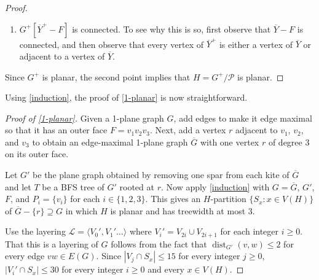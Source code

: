 \documentclass{patmorin}
\DeclareMathOperator{\dist}{dist}
\DeclarePairedDelimiter{\floor}{\lfloor}{\rfloor}
\renewcommand{\ge}{\geqslant}
\renewcommand{\le}{\leqslant}
\begin{document}
\begin{proof}
\begin{enumerate}
    \item $G^+[\overline{Y}^+-F]$ is connected. To see why this is so, first observe that $\overline{Y}-F$ is connected, and then observe that every vertex of $\overline{Y}^+$ is either a vertex of $\overline{Y}$ or adjacent to a vertex of $\overline{Y}$.
  \end{enumerate}
  Since $G^+$ is planar, the second point implies that $H=G^+/\mathcal{P}$ is planar.
\end{proof}

Using \cref{induction}, the proof of \cref{1-planar} is now straightforward. 

\begin{proof}[Proof of \cref{1-planar}]
Given a 1-plane graph $G$, add edges to make it edge maximal so that it has an outer face $F=v_1v_2v_3$. Next, add a vertex $r$ adjacent to $v_1$, $v_2$, and $v_3$ to obtain an edge-maximal 1-plane graph $\overline{G}$ with one vertex $r$ of degree 3 on its outer face. 
  
  Let $G'$ be the plane graph obtained by removing one spar from each kite of $\overline{G}$ and let $T$ be a BFS tree of $G'$ rooted at $r$.  Now apply \cref{induction} with $G=\overline{G}$, $G'$, $F$, and $P_i=\{v_i\}$ for each $i\in\{1,2,3\}$.  This gives an $H$-partition $\{S_x:x\in V(H)\}$ of $\overline{G}-\{r\}\supseteq G$ in which $H$ is planar and has treewidth at most 3.
  
  Use the layering $\mathcal{L}=\langle V_0',V_1'\ldots\rangle$ where $V_i'=V_{2i}\cup V_{2i+1}$ for each integer $i\ge 0$. That this is a layering of $G$ follows from the fact that $\dist_{G'}(v,w)\le 2$ for every edge $vw\in E(G)$.  Since $|V_j\cap S_x|\le 15$ for every integer $j\ge 0$, $|V_i'\cap S_x|\le 30$ for every integer $i\ge 0$ and every $x\in V(H)$.
\end{proof}

% 
\end{document}
